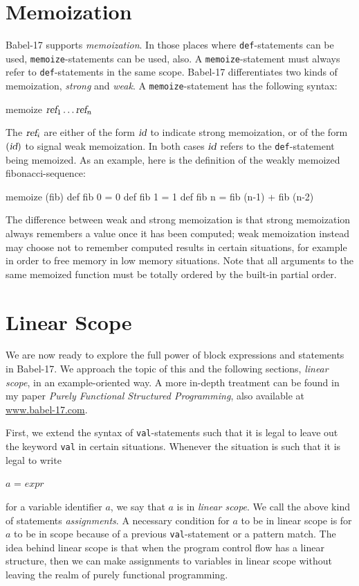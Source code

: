 \documentclass[11pt]{amsart}
\newcommand{\metababel}[1] {\textsl{#1}}
\newcommand{\babelsrc}[1] {\lstinline!#1!}
\begin{document}
\section{Memoization}
Babel-17 supports \emph{memoization}. 
In those places where \babelsrc{def}-statements can be used, \babelsrc{memoize}-statements can be used, also. A \babelsrc{memoize}-statement must always refer to \babelsrc{def}-statements in the same scope. Babel-17 differentiates two kinds of memoization, \emph{strong} and \emph{weak}. A \babelsrc{memoize}-statement has the following syntax:
\begin{babellisting}
memoize $\metababel{ref}_1 \hdots \metababel{ref}_n$
\end{babellisting}
The $\metababel{ref}_i$ are either of the form $\metababel{id}$ to indicate strong memoization, or of the form $(\metababel{id})$ to signal weak memoization. In both cases $\metababel{id}$ refers to the \babelsrc{def}-statement being memoized. As an example, here is the definition of the weakly memoized fibonacci-sequence:
\begin{babellisting}
memoize (fib)
def fib 0 = 0
def fib 1 = 1
def fib n = fib (n-1) + fib (n-2)
\end{babellisting}
The difference between weak and strong memoization is that strong memoization always remembers a value once it has been computed; weak memoization instead may choose not to remember computed results in certain situations, for example in order to free memory in low memory situations. Note that all arguments to the same memoized function must be totally ordered by the built-in partial order. 

\section{Linear Scope}
We are now ready to explore the full power of block expressions and statements in Babel-17. We approach the topic of this and the following sections, \emph{linear scope}, in an example-oriented way. A more in-depth treatment can be found in my paper \emph{Purely Functional Structured Programming}, also available at \url{www.babel-17.com}.

First, we extend the syntax of \babelsrc{val}-statements such that it is legal to leave out the keyword \babelsrc{val} in certain situations. Whenever the situation is such that it is legal to write
\begin{babellisting}
$a$ = $\textit{expr}$
\end{babellisting}
for a variable identifier $a$, we say that $a$ is in \emph{linear scope}. We call the above kind of statements \emph{assignments}. A necessary condition for $a$ to be in linear scope is for $a$ to be in scope because of a previous \babelsrc{val}-statement or a pattern match. 
The idea behind linear scope is that when the program control flow has a linear structure, then we can make assignments to variables in linear scope without leaving the realm of purely functional programming.
\end{document}
